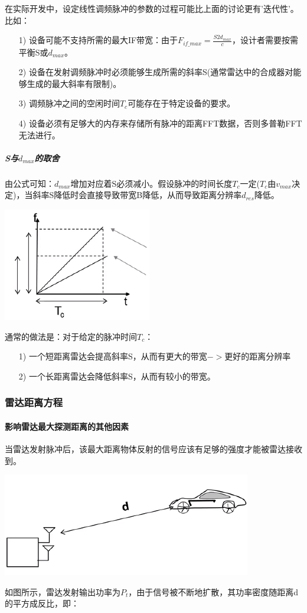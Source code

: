 \documentclass[UTF8]{ctexart}
\begin{document}
在实际开发中，设定线性调频脉冲的参数的过程可能比上面的讨论更有'迭代性'。比如：
\begin{enumerate}[1)]
\item [1)]
设备可能不支持所需的最大IF带宽：由于\(F_{if\_max}=\frac{S2d_{max}}{c}\)，设计者需要按需平衡S或$d_{max}$。
\item [2)]
设备在发射调频脉冲时必须能够生成所需的斜率S(通常雷达中的合成器对能够生成的最大斜率有限制)。
\item [3)]
调频脉冲之间的空闲时间$T_c$可能存在于特定设备的要求。
\item [4)]
设备必须有足够大的内存来存储所有脉冲的距离FFT数据，否则多普勒FFT无法进行。
\end{enumerate}
\subparagraph{S与$d_{max}$的取舍}
由公式可知：$d_{max}$增加对应着S必须减小。假设脉冲的时间长度$T_c$一定($T_c$由$v_{max}$决定)，当斜率S降低时会直接导致带宽B降低，从而导致距离分辨率$d_{res}$降低。
{\centering \includegraphics[width = .4\textwidth]{pic/sdconflicts.png}

}

通常的做法是：对于给定的脉冲时间$T_c$：
\begin{enumerate}[1)]
\item [1)]
一个短距离雷达会提高斜率S，从而有更大的带宽$->$更好的距离分辨率
\item [2)]
一个长距离雷达会降低斜率S，从而有较小的带宽。
\end{enumerate}
\subsubsection{雷达距离方程}
\paragraph{影响雷达最大探测距离的其他因素}
当雷达发射脉冲后，该最大距离物体反射的信号应该有足够的强度才能被雷达接收到。

{\centering \includegraphics[width = .4\textwidth]{pic/POWER.png}

}
如图所示，雷达发射输出功率为$P_t$，由于信号被不断地扩散，其功率密度随距离d的平方成反比，即：
\end{document}
